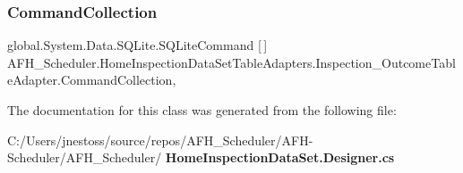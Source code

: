\subsubsection{CommandCollection}
{\footnotesize\ttfamily global.\+System.\+Data.\+S\+Q\+Lite.\+S\+Q\+Lite\+Command [$\,$] A\+F\+H\+\_\+\+Scheduler.\+Home\+Inspection\+Data\+Set\+Table\+Adapters.\+Inspection\+\_\+\+Outcome\+Table\+Adapter.\+Command\+Collection\hspace{0.3cm}{\ttfamily [get]}, {\ttfamily [protected]}}



The documentation for this class was generated from the following file\+:\begin{DoxyCompactItemize}
\item 
C\+:/\+Users/jnestoss/source/repos/\+A\+F\+H\+\_\+\+Scheduler/\+A\+F\+H-\/\+Scheduler/\+A\+F\+H\+\_\+\+Scheduler/\textbf{ Home\+Inspection\+Data\+Set.\+Designer.\+cs}\end{DoxyCompactItemize}
